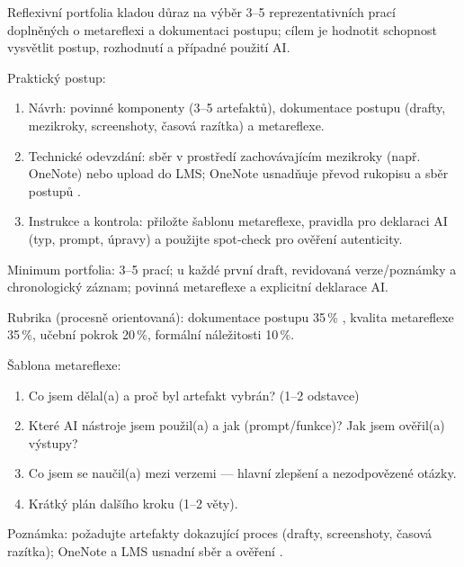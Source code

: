 Reflexivní portfolia kladou důraz na výběr 3--5 reprezentativních prací doplněných o metareflexi a dokumentaci postupu; cílem je hodnotit schopnost vysvětlit postup, rozhodnutí a případné použití AI.

Praktický postup: 
\begin{enumerate}
\item Návrh: povinné komponenty (3--5 artefaktů), dokumentace postupu (drafty, mezikroky, screenshoty, časová razítka) a metareflexe.
\item Technické odevzdání: sběr v prostředí zachovávajícím mezikroky (např. OneNote) nebo upload do LMS; OneNote usnadňuje převod rukopisu a sběr postupů \cite{kb_ai_101_tipu_pdf_04e4a115_page_8_1}.
\item Instrukce a kontrola: přiložte šablonu metareflexe, pravidla pro deklaraci AI (typ, prompt, úpravy) a použijte spot‑check pro ověření autenticity.
\end{enumerate}

Minimum portfolia: 3--5 prací; u každé první draft, revidovaná verze/poznámky a chronologický záznam; povinná metareflexe a explicitní deklarace AI.

Rubrika (procesně orientovaná): dokumentace postupu 35\,\% \cite{kb_ai_101_tipu_pdf_04e4a115_page_8_1}, kvalita metareflexe 35\,\%, učební pokrok 20\,\%, formální náležitosti 10\,\%.

Šablona metareflexe: 
\begin{enumerate}
\item Co jsem dělal(a) a proč byl artefakt vybrán? (1--2 odstavce) \item Které AI nástroje jsem použil(a) a jak (prompt/funkce)? Jak jsem ověřil(a) výstupy?
\item Co jsem se naučil(a) mezi verzemi — hlavní zlepšení a nezodpovězené otázky. \item Krátký plán dalšího kroku (1--2 věty).
\end{enumerate}

Poznámka: požadujte artefakty dokazující proces (drafty, screenshoty, časová razítka); OneNote a LMS usnadní sběr a ověření \cite{kb_ai_101_tipu_pdf_04e4a115_page_8_1}.